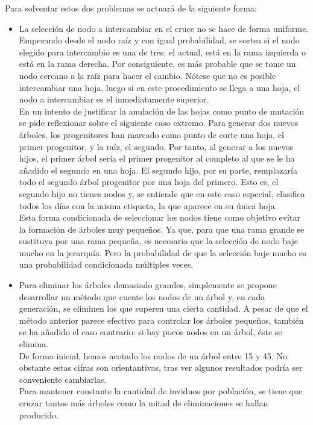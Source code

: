 Para solventar estos dos problemas se actuar\'a de la siguiente forma:\\

\begin{itemize}
    \item La selecci\'on de nodo a intercambiar en el cruce no se hace de forma uniforme. Empezando desde el nodo ra\'iz y con igual probabilidad, se sortea si el nodo elegido para intercambio es una de tres: el actual, est\'a en la rama izquierda o est\'a en la rama derecha. Por consiguiente, es m\'as probable que se tome un nodo cercano a la ra\'iz para hacer el cambio. N\'otese que no es posible intercambiar una hoja, luego si en este procedimiento se llega a una hoja, el nodo a intercambiar es el inmediatamente superior.\\
    
    En un intento de justificar la anulaci\'on de las hojas como punto de mutaci\'on se pide reflexionar sobre el siguiente caso extremo. Para generar dos nuevos \'arboles, los progenitores han marcado como punto de corte una hoja, el primer progenitor, y la ra\'iz, el segundo. Por tanto, al generar a los nuevos hijos, el primer \'arbol ser\'ia el primer progenitor al completo al que se le ha a\~nadido el segundo en una hoja. El segundo hijo, por su parte, remplazar\'ia todo el segundo \'arbol progenitor por una hoja del primero. Esto es, el segundo hijo no tienes nodos y, se entiende que en este caso especial, clasifica todos los d\'ias con la misma etiqueta, la que aparece en su \'unica hoja. \\
    
    Esta forma condicionada de seleccionar los nodos tiene como objetivo evitar la formaci\'on de \'arboles muy peque\~nos. Ya que, para que una rama grande se sustituya por una rama peque\~na, es necesario que la selecci\'on de nodo baje mucho en la jerarqu\'ia. Pero la probabilidad de que la selecci\'on baje mucho es una probabilidad condicionada m\'ultiples veces.\\
    
    \item Para eliminar los \'arboles demasiado grandes, simplemente se propone desarrollar un m\'etodo que cuente los nodos de un \'arbol y, en cada generaci\'on, se eliminen los que superen una cierta cantidad. A pesar de que el m\'etodo anterior parece efectivo para controlar los \'arboles peque\~nos, tambi\'en se ha a\~nadido el caso contrario: si hay pocos nodos en un \'arbol, \'este se elimina. \\
    
    De forma inicial, hemos acotado los nodos de un \'arbol entre 15 y 45. No obstante estas cifras son orientantivas, tras ver algunos resultados podr\'ia ser conveniente cambiarlas.\\
    
    Para mantener constante la cantidad de inviduos por poblaci\'on, se tiene que cruzar tantos m\'as \'arboles como la mitad de eliminaciones se hallan producido.\\
\end{itemize}

